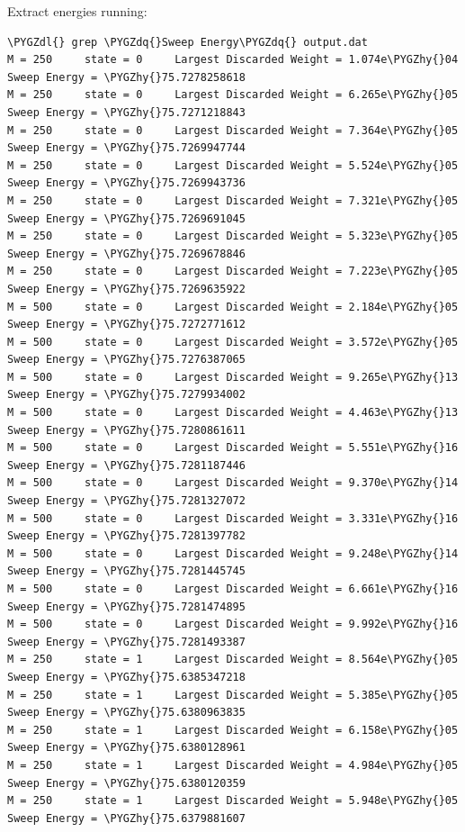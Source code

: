 \documentclass[letterpaper,10pt,english]{sphinxmanual}
\def\PYGZdl{\char`\$}
\def\PYGZhy{\char`\-}
\def\PYGZdq{\char`\"}
\begin{document}
Extract energies running:

\begin{Verbatim}[commandchars=\\\{\}]
\PYGZdl{} grep \PYGZdq{}Sweep Energy\PYGZdq{} output.dat
M = 250     state = 0     Largest Discarded Weight = 1.074e\PYGZhy{}04  Sweep Energy = \PYGZhy{}75.7278258618
M = 250     state = 0     Largest Discarded Weight = 6.265e\PYGZhy{}05  Sweep Energy = \PYGZhy{}75.7271218843
M = 250     state = 0     Largest Discarded Weight = 7.364e\PYGZhy{}05  Sweep Energy = \PYGZhy{}75.7269947744
M = 250     state = 0     Largest Discarded Weight = 5.524e\PYGZhy{}05  Sweep Energy = \PYGZhy{}75.7269943736
M = 250     state = 0     Largest Discarded Weight = 7.321e\PYGZhy{}05  Sweep Energy = \PYGZhy{}75.7269691045
M = 250     state = 0     Largest Discarded Weight = 5.323e\PYGZhy{}05  Sweep Energy = \PYGZhy{}75.7269678846
M = 250     state = 0     Largest Discarded Weight = 7.223e\PYGZhy{}05  Sweep Energy = \PYGZhy{}75.7269635922
M = 500     state = 0     Largest Discarded Weight = 2.184e\PYGZhy{}05  Sweep Energy = \PYGZhy{}75.7272771612
M = 500     state = 0     Largest Discarded Weight = 3.572e\PYGZhy{}05  Sweep Energy = \PYGZhy{}75.7276387065
M = 500     state = 0     Largest Discarded Weight = 9.265e\PYGZhy{}13  Sweep Energy = \PYGZhy{}75.7279934002
M = 500     state = 0     Largest Discarded Weight = 4.463e\PYGZhy{}13  Sweep Energy = \PYGZhy{}75.7280861611
M = 500     state = 0     Largest Discarded Weight = 5.551e\PYGZhy{}16  Sweep Energy = \PYGZhy{}75.7281187446
M = 500     state = 0     Largest Discarded Weight = 9.370e\PYGZhy{}14  Sweep Energy = \PYGZhy{}75.7281327072
M = 500     state = 0     Largest Discarded Weight = 3.331e\PYGZhy{}16  Sweep Energy = \PYGZhy{}75.7281397782
M = 500     state = 0     Largest Discarded Weight = 9.248e\PYGZhy{}14  Sweep Energy = \PYGZhy{}75.7281445745
M = 500     state = 0     Largest Discarded Weight = 6.661e\PYGZhy{}16  Sweep Energy = \PYGZhy{}75.7281474895
M = 500     state = 0     Largest Discarded Weight = 9.992e\PYGZhy{}16  Sweep Energy = \PYGZhy{}75.7281493387
M = 250     state = 1     Largest Discarded Weight = 8.564e\PYGZhy{}05  Sweep Energy = \PYGZhy{}75.6385347218
M = 250     state = 1     Largest Discarded Weight = 5.385e\PYGZhy{}05  Sweep Energy = \PYGZhy{}75.6380963835
M = 250     state = 1     Largest Discarded Weight = 6.158e\PYGZhy{}05  Sweep Energy = \PYGZhy{}75.6380128961
M = 250     state = 1     Largest Discarded Weight = 4.984e\PYGZhy{}05  Sweep Energy = \PYGZhy{}75.6380120359
M = 250     state = 1     Largest Discarded Weight = 5.948e\PYGZhy{}05  Sweep Energy = \PYGZhy{}75.6379881607

\end{Verbatim}
\end{document}
